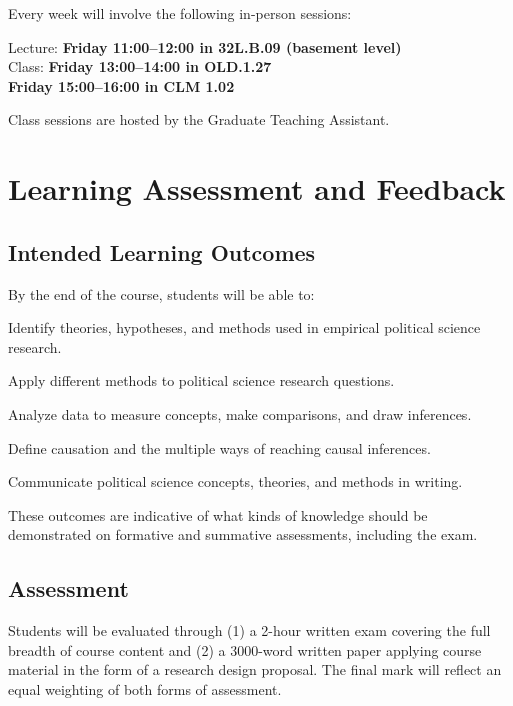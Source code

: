 \documentclass[12pt,a4paper]{article}
\begin{document}
Every week will involve the following in-person sessions:

	\begin{center}
	Lecture: \textbf{Friday 11:00--12:00 in 32L.B.09 (basement level)}\\
	Class: \textbf{Friday 13:00--14:00 in OLD.1.27}\\
	\hspace{2.8em} \textbf{Friday 15:00--16:00 in CLM 1.02}
	\end{center}

Class sessions are hosted by the Graduate Teaching Assistant.

\section{Learning Assessment and Feedback}

\subsection{Intended Learning Outcomes}

By the end of the course, students will be able to:

\begin{enumerate*}
\item Identify theories, hypotheses, and methods used in empirical political science research.
\item Apply different methods to political science research questions.
\item Analyze data to measure concepts, make comparisons, and draw inferences.
\item Define causation and the multiple ways of reaching causal inferences.
\item Communicate political science concepts, theories, and methods in writing.
\end{enumerate*}

These outcomes are indicative of what kinds of knowledge should be demonstrated on formative and summative assessments, including the exam.


\subsection{Assessment}

Students will be evaluated through (1) a 2-hour written exam covering the full breadth of course content and (2) a 3000-word written paper applying course material in the form of a research design proposal. The final mark will reflect an equal weighting of both forms of assessment.
\end{document}
